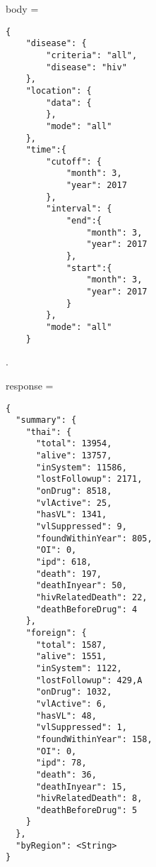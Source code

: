 \begin{multicols}{2}
body = 
\begin{verbatim}
{
	"disease": {
		"criteria": "all",
		"disease": "hiv"
	},
	"location": {
		"data": {
		},
		"mode": "all"
	},
	"time":{
		"cutoff": {
			"month": 3,
			"year": 2017
		},
		"interval": {
			"end":{
				"month": 3,
				"year": 2017
			},
			"start":{
				"month": 3,
				"year": 2017
			}
		},
		"mode": "all"	
	}
\end{verbatim}

.
\columnbreak

response =
\begin{verbatim}
{
  "summary": {
    "thai": {
      "total": 13954,
      "alive": 13757,
      "inSystem": 11586,
      "lostFollowup": 2171,
      "onDrug": 8518,
      "vlActive": 25,
      "hasVL": 1341,
      "vlSuppressed": 9,
      "foundWithinYear": 805,
      "OI": 0,
      "ipd": 618,
      "death": 197,
      "deathInyear": 50,
      "hivRelatedDeath": 22,
      "deathBeforeDrug": 4
    },
    "foreign": {
      "total": 1587,
      "alive": 1551,
      "inSystem": 1122,
      "lostFollowup": 429,A
      "onDrug": 1032,
      "vlActive": 6,
      "hasVL": 48,
      "vlSuppressed": 1,
      "foundWithinYear": 158,
      "OI": 0,
      "ipd": 78,
      "death": 36,
      "deathInyear": 15,
      "hivRelatedDeath": 8,
      "deathBeforeDrug": 5
    }
  },
  "byRegion": <String>
}
\end{verbatim}
\end{multicols}